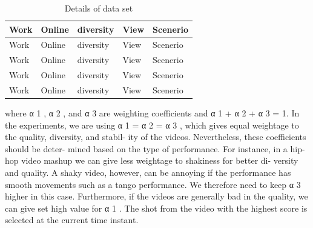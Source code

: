 \documentclass{sig-alternate}
\begin{document}
\begin{table}
\centering
\caption{ Details of data set }
\begin{tabular}{p{1.2cm}|p{1.2cm}|p{1.2cm}|p{1.2cm}|l} \hline
Work&Online&diversity&View & Scenerio\\ \hline
Work&Online&diversity&View & Scenerio\\ \hline
Work&Online&diversity&View & Scenerio\\ \hline
Work&Online&diversity&View & Scenerio\\ \hline
Work&Online&diversity&View & Scenerio\\ \hline
\end{tabular}
\end{table}

where α 1 , α 2 , and α 3 are weighting coefficients and α 1 + α 2 +
α 3 = 1. In the experiments, we are using α 1 = α 2 = α 3 ,
which gives equal weightage to the quality, diversity, and stabil-
ity of the videos. Nevertheless, these coefficients should be deter-
mined based on the type of performance. For instance, in a hip-hop
video mashup we can give less weightage to shakiness for better di-
versity and quality. A shaky video, however, can be annoying if the
performance has smooth movements such as a tango performance.
We therefore need to keep α 3 higher in this case. Furthermore, if
the videos are generally bad in the quality, we can give set high
value for α 1 . The shot from the video with the highest score is
selected at the current time instant.
\end{document}
